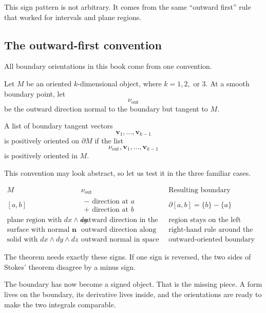 This sign pattern is not arbitrary.  It comes from the same ``outward first'' rule that
worked for intervals and plane regions.

\subsection{The outward-first convention}

All boundary orientations in this book come from one convention.

\begin{definition}
Let \(M\) be an oriented \(k\)-dimensional object, where \(k=1,2,\) or \(3\).  At a
smooth boundary point, let
\[
    \nu_{\text{out}}
\]
be the outward direction normal to the boundary but tangent to \(M\).

A list of boundary tangent vectors
\[
    \mathbf v_1,\ldots,\mathbf v_{k-1}
\]
is positively oriented on \(\partial M\) if the list
\[
\boxed{
    \nu_{\text{out}},\mathbf v_1,\ldots,\mathbf v_{k-1}
}
\]
is positively oriented in \(M\).
\end{definition}

This convention may look abstract, so let us test it in the three familiar cases.

\[
\begin{array}{c|c|c}
M & \nu_{\text{out}} & \text{Resulting boundary orientation} \\ \hline
[a,b] &
\begin{array}{c}
- \text{ direction at }a\\
+ \text{ direction at }b
\end{array}
&
\partial[a,b]=\{b\}-\{a\}
\\[5mm]
\text{plane region with }dx\wedge dy &
\text{outward direction in the plane} &
\text{region stays on the left}
\\[2mm]
\text{surface with normal }\mathbf n &
\text{outward direction along the surface} &
\text{right-hand rule around the boundary}
\\[2mm]
\text{solid with }dx\wedge dy\wedge dz &
\text{outward normal in space} &
\text{outward-oriented boundary surface}
\end{array}
\]

The theorem needs exactly these signs.  If one sign is reversed, the two sides of
Stokes' theorem disagree by a minus sign.

The boundary has now become a signed object.  That is the missing piece.  A form lives
on the boundary, its derivative lives inside, and the orientations are ready to make the
two integrals comparable.


